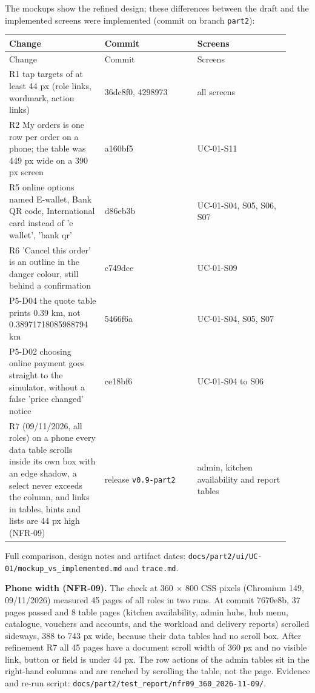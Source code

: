 The mockups show the refined design; these differences between the draft and the implemented screens were implemented (commit on branch \texttt{part2}):

\begin{longtable}{>{\raggedright\arraybackslash}p{0.3067\linewidth}>{\raggedright\arraybackslash}p{0.3067\linewidth}>{\raggedright\arraybackslash}p{0.3067\linewidth}}
Change & Commit & Screens \\
\hline\endfirsthead
Change & Commit & Screens \\
\hline\endhead
R1 tap targets of at least 44 px (role links, wordmark, action links) & 36dc8f0, 4298973 & all screens \\
R2 My orders is one row per order on a phone; the table was 449 px wide on a 390 px screen & a160bf5 & UC-01-S11 \\
R5 online options named E-wallet, Bank QR code, International card instead of 'e wallet', 'bank qr' & d86eb3b & UC-01-S04, S05, S06, S07 \\
R6 'Cancel this order' is an outline in the danger colour, still behind a confirmation & c749dce & UC-01-S09 \\
P5-D04 the quote table prints 0.39 km, not 0.38971718085988794 km & 5466f6a & UC-01-S04, S05, S07 \\
P5-D02 choosing online payment goes straight to the simulator, without a false 'price changed' notice & ce18bf6 & UC-01-S04 to S06 \\
R7 (09/11/2026, all roles) on a phone every data table scrolls inside its own box with an edge shadow, a select never exceeds the column, and links in tables, hints and lists are 44 px high (NFR-09) & release \texttt{v0.\allowbreak{}9-part2} & admin, kitchen availability and report tables \\
\end{longtable}
Full comparison, design notes and artifact dates: \texttt{docs/\allowbreak{}part2/\allowbreak{}ui/\allowbreak{}UC-01/\allowbreak{}mockup\_\allowbreak{}vs\_\allowbreak{}implemented.\allowbreak{}md} and \texttt{trace.\allowbreak{}md}.

\textbf{Phone width (NFR-09).} The check at 360 \ensuremath{\times} 800 CSS pixels (Chromium 149, 09/11/2026) measured 45 pages of all roles in two runs. At commit 7670e8b, 37 pages passed and 8 table pages (kitchen availability, admin hubs, hub menu, catalogue, vouchers and accounts, and the workload and delivery reports) scrolled sideways, 388 to 743 px wide, because their data tables had no scroll box. After refinement R7 all 45 pages have a document scroll width of 360 px and no visible link, button or field is under 44 px. The row actions of the admin tables sit in the right-hand columns and are reached by scrolling the table, not the page. Evidence and re-run script: \texttt{docs/\allowbreak{}part2/\allowbreak{}test\_\allowbreak{}report/\allowbreak{}nfr09\_\allowbreak{}360\_\allowbreak{}2026-11-09/\allowbreak{}}.

